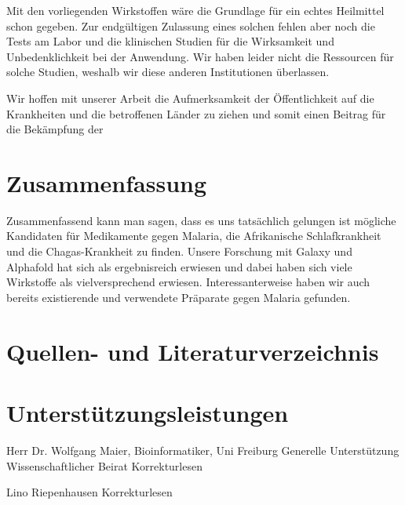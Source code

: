 \documentclass[11pt]{article}
\begin{document}
    Mit den vorliegenden Wirkstoffen wäre die Grundlage für ein echtes Heilmittel schon gegeben.
    Zur endgültigen Zulassung eines solchen fehlen aber noch die Tests am Labor und die klinischen Studien für die Wirksamkeit und Unbedenklichkeit bei der Anwendung.
    Wir haben leider nicht die Ressourcen für solche Studien, weshalb wir diese anderen Institutionen überlassen.

    Wir hoffen mit unserer Arbeit die Aufmerksamkeit der Öffentlichkeit auf die Krankheiten und die betroffenen Länder zu ziehen und somit einen Beitrag für die Bekämpfung der



    \section{Zusammenfassung}\label{sec:zusammenfassung}
    Zusammenfassend kann man sagen, dass es uns tatsächlich gelungen ist mögliche Kandidaten für Medikamente gegen Malaria, die Afrikanische Schlafkrankheit und die Chagas-Krankheit zu finden.
    Unsere Forschung mit Galaxy und Alphafold hat sich als ergebnisreich erwiesen und dabei haben sich viele Wirkstoffe als vielversprechend erwiesen.
    Interessanterweise haben wir auch bereits existierende und verwendete Präparate gegen Malaria gefunden.



    \section{Quellen- und Literaturverzeichnis}\label{sec:quellen--und-literaturverzeichnis}



    \section{Unterstützungsleistungen}\label{sec:unterstuetzungsleistungen}

    Herr Dr. Wolfgang Maier, Bioinformatiker, Uni Freiburg
    Generelle Unterstützung
    Wissenschaftlicher Beirat
    Korrekturlesen

    Lino Riepenhausen
    Korrekturlesen
\end{document}
